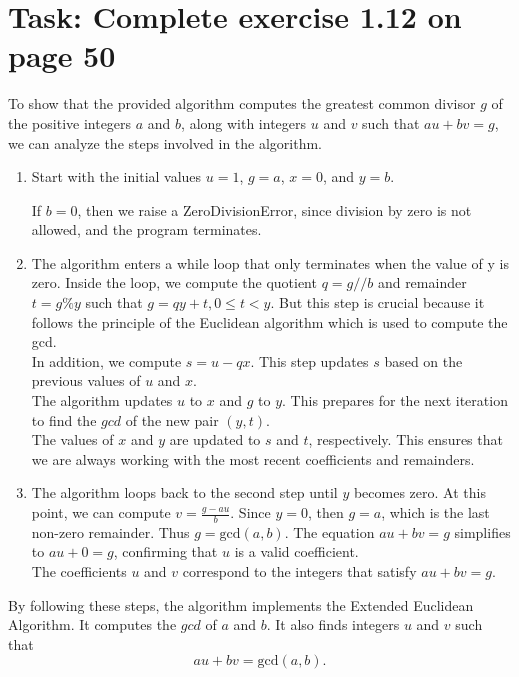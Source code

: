 \documentclass[12pt]{ut-thesis}
\theoremstyle{definition}
\begin{document}
	\section*{Task: Complete exercise 1.12 on page 50}
		To show that the provided algorithm computes the greatest common divisor \( g \) of the positive integers \( a \) and \( b \), along with integers \( u \) and \( v \) such that \( au + bv = g \), we can analyze the steps involved in the algorithm.
		
		\begin{enumerate}
			\item Start with the initial values \( u = 1 \), \( g = a \), \( x = 0 \), and \( y = b \). 
			
			If $b=0$, then we raise a ZeroDivisionError, since division by zero is not allowed, and the program terminates. 
			
			\item The algorithm enters a while loop that only terminates when the value of y is zero. Inside the loop, we compute the quotient $q = g//b$ and remainder $t = g\%y$ such that $g = qy + t, 0\le t < y$. But this step is crucial because it follows the principle of the Euclidean algorithm which is used to compute the gcd. \\ 
			
			In addition, we compute \( s = u - qx \). This step updates \( s \) based on the previous values of \( u \) and \( x \).\\
			
			The algorithm updates \( u \) to \( x \) and \( g \) to \( y \). This prepares for the next iteration to find the $gcd$ of the new pair \( (y, t) \).\\
			
			The values of \( x \) and \( y \) are updated to \( s \) and \( t \), respectively. This ensures that we are always working with the most recent coefficients and remainders.\\
			
			\item The algorithm loops back to the second step until \( y \) becomes zero. 
			At this point, we can compute \( v = \frac{g - au}{b} \). Since \( y = 0 \), then \( g = a \), which is the last non-zero remainder. Thus \( g = \text{gcd}(a, b) \). The equation \( au + bv = g \) simplifies to \( au + 0 = g \), confirming that \( u \) is a valid coefficient.\\
						
			The coefficients \( u \) and \( v \) correspond to the integers that satisfy \( au + bv = g \). 
			
		\end{enumerate}
		By following these steps, the algorithm implements the Extended Euclidean Algorithm. It computes the $gcd$ of \( a \) and \( b \). It also finds integers \( u \) and \( v \) such that $$ au + bv = \text{gcd}(a, b). $$
		
\end{document}
